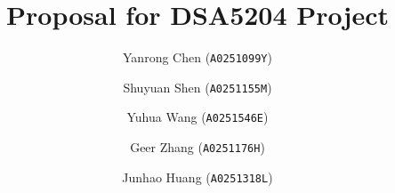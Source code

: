 \author{
  Yanrong Chen (\texttt{A0251099Y})
  \and
  Shuyuan Shen (\texttt{A0251155M})
  \and
  Yuhua Wang (\texttt{A0251546E})
  \and
  Geer Zhang (\texttt{A0251176H})
  \and
  Junhao Huang (\texttt{A0251318L})
}

\title{Proposal for DSA5204 Project}  %
\date{}
